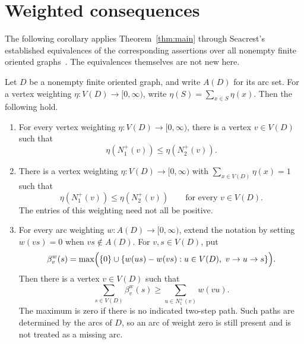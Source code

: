 \section{Weighted consequences}\label{sec:weighted-consequences}

The following corollary applies Theorem~\ref{thm:main} through Seacrest's
established equivalences of the corresponding assertions over all nonempty
finite oriented graphs~\cite{Seacrest2015}.  The equivalences themselves are
not new here.

\begin{corollary}\label{cor:weighted-forms}
Let \(D\) be a nonempty finite oriented graph, and write \(A(D)\) for its
arc set.  For a vertex weighting \(\eta:V(D)\to[0,\infty)\), write
\(\eta(S)=\sum_{x\in S}\eta(x)\).  Then the following hold.
\begin{enumerate}[label=\textup{(\roman*)}]
\item For every vertex weighting \(\eta:V(D)\to[0,\infty)\), there is a
vertex \(v\in V(D)\) such that
\[
 \eta(N_1^+(v))\leq\eta(N_2^+(v)).
\]

\item There is a vertex weighting \(\eta:V(D)\to[0,\infty)\) with
\(\sum_{x\in V(D)}\eta(x)=1\) such that
\[
 \eta(N_1^+(v))\leq\eta(N_2^+(v))\qquad\text{for every }v\in V(D).
\]
The entries of this weighting need not all be positive.

\item For every arc weighting \(w:A(D)\to[0,\infty)\), extend the notation
by setting \(w(vs)=0\) when \(vs\notin A(D)\).  For \(v,s\in V(D)\), put
\[
 \beta_v^w(s)=\max\Bigl(\{0\}\cup
 \{w(us)-w(vs):u\in V(D),\ v\to u\to s\}\Bigr).
\]
Then there is a vertex \(v\in V(D)\) such that
\[
 \sum_{s\in V(D)}\beta_v^w(s)
 \geq \sum_{u\in N_1^+(v)}w(vu).
\]
The maximum is zero if there is no indicated two-step path.  Such paths
are determined by the arcs of \(D\), so an arc of weight zero is still
present and is not treated as a missing arc.
\end{enumerate}
\end{corollary}

